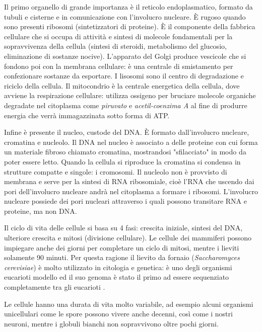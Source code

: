 \par Il primo organello di grande importanza è il reticolo endoplasmatico, formato da tubuli e cisterne e in comunicazione con l'involucro nucleare. È rugoso quando sono presenti ribosomi (sintetizzatori di proteine). È il componente della fabbrica cellulare che si occupa di attività e sintesi di molecole fondamentali per la sopravvivenza della cellula (sintesi di steroidi, metabolismo del glucosio, eliminazione di sostanze nocive). L'apparato del Golgi produce vescicole che si fondono poi con la membrana cellulare: è una centrale di smistamento per confezionare sostanze da esportare. I lisosomi sono il centro di degradazione e riciclo della cellula. Il mitocondrio è la centrale energetica della cellula, dove avviene la respirazione cellulare: utilizza ossigeno per bruciare molecole organiche degradate nel citoplasma come \textit{piruvato} e \textit{acetil-coenzima A} al fine di produrre energia che verrà immagazzinata sotto forma di ATP.

\par Infine è presente il nucleo, custode del DNA. È formato dall'involucro nucleare, cromatina e nucleolo. Il DNA nel nucleo è associato a delle proteine con cui forma un materiale fibroso chiamato cromatina, mostrandosi "sfilacciato" in modo da poter essere letto. Quando la cellula si riproduce la cromatina si condensa in strutture compatte e singole: i cromosomi. Il nucleolo non è provvisto di membrana e serve per la sintesi di RNA ribosomiale, cioè l'RNA che uscendo dai pori dell'involucro nucleare andrà nel citoplasma a formare i ribosomi. L'involucro nucleare possiede dei pori nucleari attraverso i quali possono transitare RNA e proteine, ma non DNA.

\par Il ciclo di vita delle cellule si basa su 4 fasi: crescita iniziale, sintesi del DNA, ulteriore crescita e mitosi (divisione cellulare). Le cellule dei mammiferi possono impiegare anche dei giorni per completare un ciclo di mitosi, mentre i lieviti solamente 90 minuti. Per questa ragione il lievito da fornaio (\textit{Saccharomyces cerevisiae}) è molto utilizzato in citologia e genetica: è uno degli organismi eucarioti modello\supercite{alberts2018essential} ed il suo genoma è stato il primo ad essere sequenziato completamente tra gli eucarioti \supercite{lievitoWiki}.

\par Le cellule hanno una durata di vita molto variabile, ad esempio alcuni organismi unicellulari come le spore possono vivere anche decenni, così come i nostri neuroni, mentre i globuli bianchi non sopravvivono oltre pochi giorni. \\


